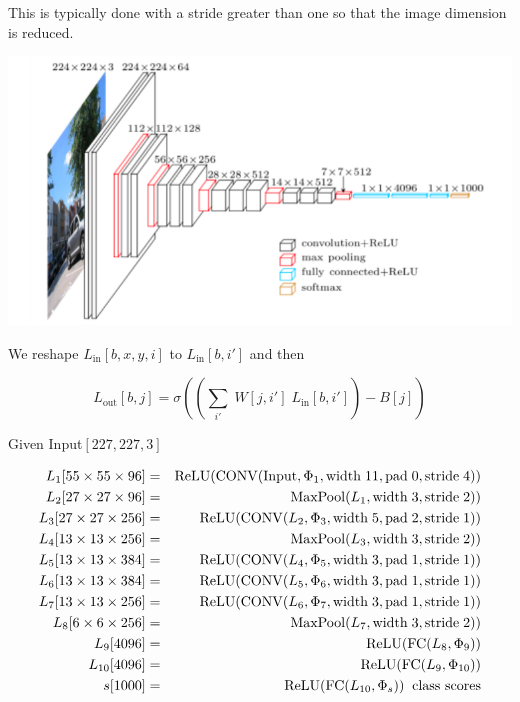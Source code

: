 {\vfill
This is typically done with a stride greater than one so that the image dimension is reduced.



\centerline{\includegraphics[width = 8.0in]{../images/VGG}}



We reshape $L_{\mathrm{in}}[b,x,y,i]$ to $L_{\mathrm{in}}[b,i']$ and then

\vfill
$$L_{\mathrm{out}}[b,j] = \sigma\left(\left(\sum_{i'} \;W[j,i']\;L_{\mathrm{in}}[b,i']\right) - B[j]\right)$$

{\huge
\centerline{Given Input$[227,227,3]$}

\begin{eqnarray*}
L_1[55 \times 55 \times 96] & = & \mathrm{ReLU}(\mathrm{CONV}(\mathrm{Input},\Phi_1,\mathrm{width}\;11,\mathrm{pad}\;0,\mathrm{stride}\;4)) \\
L_2[27 \times 27 \times 96] & = & \mathrm{MaxPool}(L_1,\mathrm{width}\;3,\mathrm{stride}\;2))  \\
L_3[27 \times 27 \times 256] & = & \mathrm{ReLU}(\mathrm{CONV}(L_2,\Phi_3,\mathrm{width}\;5,\mathrm{pad}\;2,\mathrm{stride}\;1))  \\
L_4[13 \times 13 \times 256] & = & \mathrm{MaxPool}(L_3,\mathrm{width}\;3,\mathrm{stride}\;2))  \\
L_5[13 \times 13 \times 384] & = & \mathrm{ReLU}(\mathrm{CONV}(L_4,\Phi_5,\mathrm{width}\;3,\mathrm{pad}\;1,\mathrm{stride}\;1))  \\
L_6[13 \times 13 \times 384] & = & \mathrm{ReLU}(\mathrm{CONV}(L_5,\Phi_6,\mathrm{width}\;3,\mathrm{pad}\;1,\mathrm{stride}\;1))  \\
L_7[13 \times 13 \times 256] & = & \mathrm{ReLU}(\mathrm{CONV}(L_6,\Phi_7,\mathrm{width}\;3,\mathrm{pad}\;1,\mathrm{stride}\;1))  \\
L_8[6 \times 6 \times 256] & = & \mathrm{MaxPool}(L_7,\mathrm{width}\;3,\mathrm{stride}\;2)) \\
L_9[4096] & = & \mathrm{ReLU}(\mathrm{FC}(L_8,\Phi_9)) \\
L_{10}[4096] & = & \mathrm{ReLU}(\mathrm{FC}(L_9,\Phi_{10})) \\
s[1000] & = & \mathrm{ReLU}(\mathrm{FC}(L_{10},\Phi_s)) \;\;\mbox{class scores}
\end{eqnarray*}
}

}
